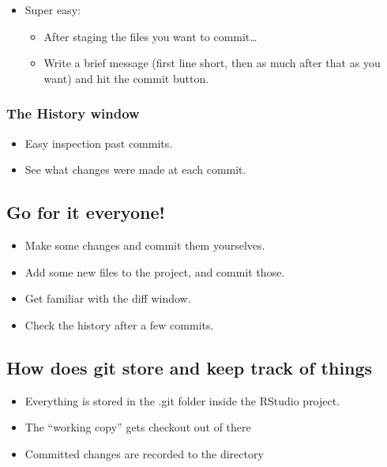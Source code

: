 \documentclass[]{book}
\providecommand{\tightlist}{%
  \setlength{\itemsep}{0pt}\setlength{\parskip}{0pt}}
\theoremstyle{definition}
\theoremstyle{definition}
\theoremstyle{remark}
\begin{document}
\begin{itemize}
\tightlist
\item
  Super easy:

  \begin{itemize}
  \tightlist
  \item
    After staging the files you want to commit\ldots{}
  \item
    Write a brief message (first line short, then as much after that as
    you want) and hit the commit button.
  \end{itemize}
\end{itemize}

\subsubsection{The History window}\label{the-history-window}

\begin{itemize}
\tightlist
\item
  Easy inspection past commits.
\item
  See what changes were made at each commit.
\end{itemize}

\subsection{Go for it everyone!}\label{git-play}

\begin{itemize}
\tightlist
\item
  Make some changes and commit them yourselves.\\
\item
  Add some new files to the project, and commit those.
\item
  Get familiar with the diff window.
\item
  Check the history after a few commits.
\end{itemize}

\subsection{How does git store and keep track of things}\label{git-how}

\begin{itemize}
\tightlist
\item
  Everything is stored in the .git folder inside the RStudio project.
\item
  The ``working copy'' gets checkout out of there
\item
  Committed changes are recorded to the directory
\end{itemize}
\end{document}

